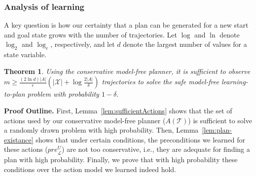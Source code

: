 \documentclass{article}
\newenvironment{proof}{\noindent{\bf Proof:~~}}{\qed}
\newcommand{\qed}{\hfill\ensuremath{\blacksquare}}
\newcommand{\pre}{\textit{pre}}
\newtheorem{theorem}{Theorem}
\newcommand{\MEMO}[1]
{ \fbox{
		\begin{minipage}[b]{7.9 cm}
			#1
		\end{minipage}
} }
\begin{document}
	\subsubsection{Analysis of learning}
	A key question is how our certainty that a plan can be generated for a new start and goal state grows with the number of trajectories. Let $\log$ and $\ln$ denote $\log_2$ and $\log_e$, respectively, and let $d$ denote the largest number of values
	for a state variable. 
	\begin{theorem}
		Using the conservative model-free planner, 
		it is sufficient to observe 
		$m\geq\frac{(2\ln  d)|A|}{\epsilon}(|\mathcal{X}|+\log\frac{2|A|}{\delta})$
		trajectories to solve the safe model-free learning-to-plan problem with probability $1-\delta$. 
		\label{the:pac-conformant}
	\end{theorem}
	{\bf Proof Outline.} First, Lemma~\ref{lem:sufficientActions} shows 
		that the set of actions used by our conservative model-free planner ($A(\mathcal{T})$) 
		is sufficient to solve a randomly drawn problem with high probability. 
		Then, Lemma~\ref{lem:plan-existance} shows that 
		under certain conditions, the preconditions we learned for these actions ($\pre_\mathcal{L}^U$) 
		are not too conservative, i.e., they are adequate
		for finding a plan with high probability.  
		Finally, we prove that with high probability these conditions over the action model we learned 
		indeed hold. 
		
		
		
\end{document}
